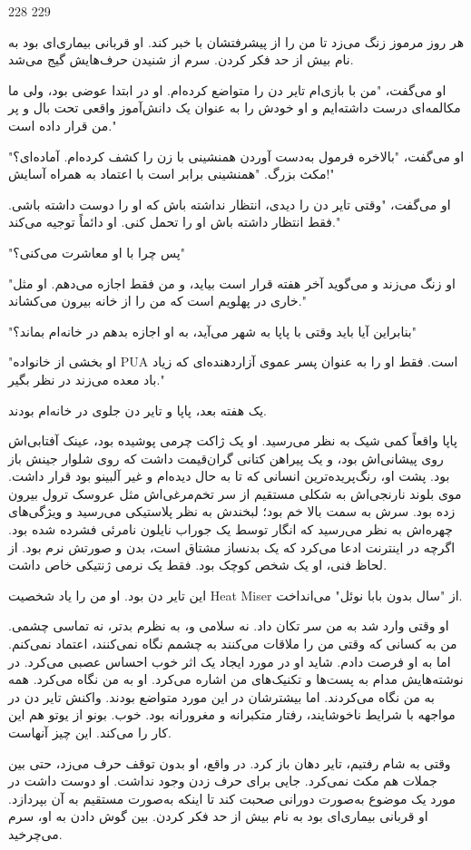 228 229

هر روز مرموز زنگ می‌زد تا من را از پیشرفتشان با خبر کند. او قربانی بیماری‌ای بود به نام بیش از حد فکر کردن. سرم از شنیدن حرف‌هایش گیج می‌شد.

او می‌گفت، "من با بازی‌ام تایر دن را متواضع کرده‌ام. او در ابتدا عوضی بود، ولی ما مکالمه‌ای درست داشته‌ایم و او خودش را به عنوان یک دانش‌آموز واقعی تحت بال و پر من قرار داده است."

او می‌گفت، "بالاخره فرمول به‌دست آوردن همنشینی با زن را کشف کرده‌ام. آماده‌ای؟" مکث بزرگ. "همنشینی برابر است با اعتماد به همراه آسایش!"

او می‌گفت، "وقتی تایر دن را دیدی، انتظار نداشته باش که او را دوست داشته باشی. فقط انتظار داشته باش او را تحمل کنی. او دائماً توجیه می‌کند."

"پس چرا با او معاشرت می‌کنی؟"

"او زنگ می‌زند و می‌گوید آخر هفته قرار است بیاید، و من فقط اجازه می‌دهم. او مثل خاری در پهلویم است که من را از خانه بیرون می‌کشاند."

"بنابراین آیا باید وقتی با پاپا به شهر می‌آید، به او اجازه بدهم در خانه‌ام بماند؟"

"او بخشی از خانواده PUA است. فقط او را به عنوان پسر عموی آزاردهنده‌ای که زیاد باد معده می‌زند در نظر بگیر."

یک هفته بعد، پاپا و تایر دن جلوی در خانه‌ام بودند.

پاپا واقعاً کمی شیک به نظر می‌رسید. او یک ژاکت چرمی پوشیده بود، عینک آفتابی‌اش روی پیشانی‌اش بود، و یک پیراهن کتانی گران‌قیمت داشت که روی شلوار جینش باز بود. پشت او، رنگ‌پریده‌ترین انسانی که تا به حال دیده‌ام و غیر آلبینو بود قرار داشت. موی بلوند نارنجی‌اش به شکلی مستقیم از سر تخم‌مرغی‌اش مثل عروسک ترول بیرون زده بود. سرش به سمت بالا خم بود؛ لبخندش به نظر پلاستیکی می‌رسید و ویژگی‌های چهره‌اش به نظر می‌رسید که انگار توسط یک جوراب نایلون نامرئی فشرده شده بود. اگرچه در اینترنت ادعا می‌کرد که یک بدنساز مشتاق است، بدن و صورتش نرم بود. از لحاظ فنی، او یک شخص کوچک بود. فقط یک نرمی ژنتیکی خاص داشت.

این تایر دن بود. او من را یاد شخصیت Heat Miser از "سال بدون بابا نوئل" می‌انداخت.

او وقتی وارد شد به من سر تکان داد. نه سلامی و، به نظرم بدتر، نه تماسی چشمی. من به کسانی که وقتی من را ملاقات می‌کنند به چشمم نگاه نمی‌کنند، اعتماد نمی‌کنم. اما به او فرصت دادم. شاید او در مورد ایجاد یک اثر خوب احساس عصبی می‌کرد. در نوشته‌هایش مدام به پست‌ها و تکنیک‌های من اشاره می‌کرد. او به من نگاه می‌کرد. همه به من نگاه می‌کردند. اما بیشترشان در این مورد متواضع بودند. واکنش تایر دن در مواجهه با شرایط ناخوشایند، رفتار متکبرانه و مغرورانه بود. خوب. بونو از یوتو هم این کار را می‌کند. این چیز آنهاست.

وقتی به شام رفتیم، تایر دهان باز کرد. در واقع، او بدون توقف حرف می‌زد، حتی بین جملات هم مکث نمی‌کرد. جایی برای حرف زدن وجود نداشت. او دوست داشت در مورد یک موضوع به‌صورت دورانی صحبت کند تا اینکه به‌صورت مستقیم به آن بپردازد. او قربانی بیماری‌ای بود به نام بیش از حد فکر کردن. بین گوش دادن به او، سرم می‌چرخید.